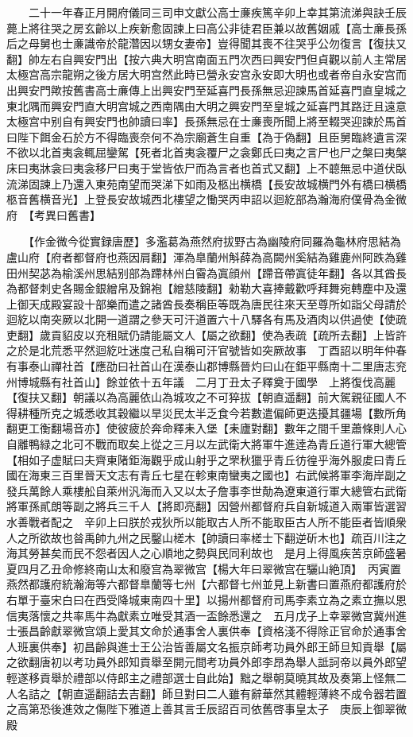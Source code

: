 　　二十一年春正月開府儀同三司申文獻公高士亷疾篤辛卯上幸其第流涕與訣壬辰薨上將往哭之房玄齡以上疾新愈固諫上曰高公非徒君臣兼以故舊姻戚【高士亷長孫后之母舅也士亷識帝於龍濳因以甥女妻帝】豈得聞其喪不往哭乎公勿復言【復扶又翻】帥左右自興安門出【按六典大明宫南面五門次西曰興安門但貞觀以前人主常居太極宫高宗龍朔之後方居大明宫然此時已營永安宫永安即大明也或者帝自永安宫而出興安門歟按舊書高士亷傳上出興安門至延喜門長孫無忌迎諫馬首延喜門直皇城之東北隅而興安門直大明宫城之西南隅由大明之興安門至皇城之延喜門其路迂且遠意太極宫中别自有興安門也帥讀曰率】長孫無忌在士亷喪所聞上將至輟哭迎諫於馬首曰陛下餌金石於方不得臨喪奈何不為宗廟蒼生自重【為于偽翻】且臣舅臨終遺言深不欲以北首夷衾輒屈鑾駕【死者北首夷衾覆尸之衾鄭氏曰夷之言尸也尸之槃曰夷槃床曰夷牀衾曰夷衾移尸曰夷于堂皆依尸而為言者也首式又翻】上不聼無忌中道伏臥流涕固諫上乃還入東苑南望而哭涕下如雨及柩出横橋【長安故城横門外有橋曰横橋柩音舊横音光】上登長安故城西北樓望之慟哭丙申詔以迴紇部為瀚海府僕骨為金微府　【考異曰舊書】

　　【作金微今從實録唐歷】多濫葛為燕然府拔野古為幽陵府同羅為龜林府思結為盧山府【府者都督府也燕因肩翻】渾為臯蘭州斛薛為高闕州奚結為雞鹿州阿跌為雞田州契苾為榆溪州思結别部為蹛林州白霫為寘顔州【蹛音帶寘徒年翻】各以其酋長為都督刺史各賜金銀繒帛及錦袍【繒慈陵翻】勑勒大喜捧戴歡呼拜舞宛轉塵中及還上御天成殿宴設十部樂而遣之諸酋長奏稱臣等既為唐民往來天至尊所如詣父母請於迴紇以南突厥以北開一道謂之參天可汗道置六十八驛各有馬及酒肉以供過使【使疏吏翻】歲貢貂皮以充租賦仍請能屬文人【屬之欲翻】使為表疏【疏所去翻】上皆許之於是北荒悉平然迴紇吐迷度己私自稱可汗官號皆如突厥故事　丁酉詔以明年仲春有事泰山禪社首【應劭曰社首山在漢泰山郡博縣晉灼曰山在鉅平縣南十二里唐志兖州博城縣有社首山】餘並依十五年議　二月丁丑太子釋奠于國學　上將復伐高麗【復扶又翻】朝議以為高麗依山為城攻之不可猝拔【朝直遥翻】前大駕親征國人不得耕種所克之城悉收其穀繼以旱災民太半乏食今若數遣偏師更迭擾其疆場【數所角翻更工衡翻場音亦】使彼疲於奔命釋耒入堡【耒廬對翻】數年之間千里蕭條則人心自離鴨緑之北可不戰而取矣上從之三月以左武衛大將軍牛進逹為青丘道行軍大總管【相如子虚賦曰夫齊東陼鉅海觀乎成山射乎之罘秋獵乎青丘彷徨乎海外服䖍曰青丘國在海東三百里晉天文志有青丘七星在軫東南蠻夷之國也】右武候將軍李海岸副之發兵萬餘人乘樓舩自萊州汎海而入又以太子詹事李世勣為遼東道行軍大總管右武衛將軍孫貳朗等副之將兵三千人【將即亮翻】因營州都督府兵自新城道入兩軍皆選習水善戰者配之　辛卯上曰朕於戎狄所以能取古人所不能取臣古人所不能臣者皆順衆人之所欲故也㫺禹帥九州之民鑿山槎木【帥讀曰率槎士下翻逆斫木也】疏百川注之海其勞甚矣而民不怨者因人之心順地之勢與民同利故也　是月上得風疾苦京師盛暑夏四月乙丑命修終南山太和廢宫為翠微宫【楊大年曰翠微宫在驪山絶頂】　丙寅置燕然都護府統瀚海等六都督臯蘭等七州【六都督七州並見上新書曰置燕府都護府於右單于臺宋白曰在西受降城東南四十里】以揚州都督府司馬李素立為之素立撫以恩信夷落懷之共率馬牛為獻素立唯受其酒一盃餘悉還之　五月戊子上幸翠微宫冀州進士張昌齡獻翠微宫頌上愛其文命於通事舍人裏供奉【資格淺不得除正官命於通事舍人班裏供奉】初昌齡與進士王公治皆善屬文名振京師考功員外郎王師旦知貢舉【屬之欲翻唐初以考功員外郎知貢舉至開元間考功員外郎李昂為舉人詆訶帝以員外郎望輕遂移貢舉於禮部以侍郎主之禮部選士自此始】黜之舉朝莫曉其故及奏第上怪無二人名詰之【朝直遥翻詰去吉翻】師旦對曰二人雖有辭華然其體輕薄終不成令器若置之高第恐後進效之傷陛下雅道上善其言壬辰詔百司依舊啓事皇太子　庚辰上御翠微殿

